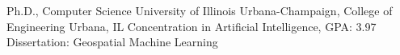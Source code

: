 
        {Ph.D., Computer Science}
        {University of Illinois Urbana-Champaign, College of Engineering}
        {Urbana, IL}
        {Concentration in Artificial Intelligence, GPA: 3.97}
        {Dissertation: Geospatial Machine Learning}
